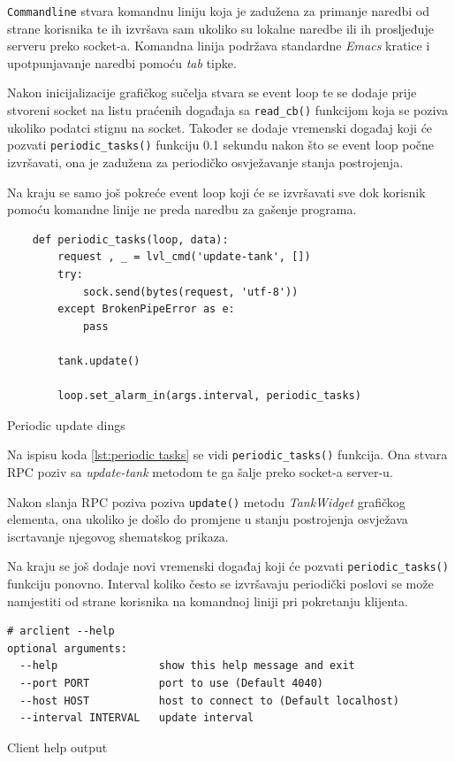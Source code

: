 \texttt{Commandline} stvara komandnu liniju koja je zadužena za
primanje naredbi od strane korisnika te ih izvršava sam ukoliko su lokalne
naredbe ili ih prosljeđuje serveru preko socket-a. Komandna linija podržava
standardne \emph{Emacs} kratice i upotpunjavanje naredbi pomoću \emph{tab}
tipke.

Nakon inicijalizacije grafičkog sučelja stvara se event loop te se dodaje prije
stvoreni socket na listu praćenih događaja sa \texttt{read_cb()}
funkcijom koja se poziva ukoliko podatci stignu na socket. Također se dodaje
vremenski događaj koji će pozvati \texttt{periodic_tasks()} funkciju
0.1 sekundu nakon što se event loop počne izvršavati, ona je zadužena za
periodičko osvježavanje stanja postrojenja.

Na kraju se samo još pokreće event loop koji će se izvršavati sve dok korisnik
pomoću komandne linije ne preda naredbu za gašenje programa.

\begin{listing}[H]
\centering
\begin{verbatim}
    def periodic_tasks(loop, data):
        request , _ = lvl_cmd('update-tank', [])
        try:
            sock.send(bytes(request, 'utf-8'))
        except BrokenPipeError as e:
            pass

        tank.update()

        loop.set_alarm_in(args.interval, periodic_tasks)
\end{verbatim}
\caption{Periodic update dings}
\label{lst:periodic tasks}
\end{listing}

Na ispisu koda \ref{lst:periodic tasks} se vidi
\texttt{periodic_tasks()} funkcija. Ona stvara RPC poziv sa
\emph{update-tank} metodom te ga šalje preko socket-a server-u.

Nakon slanja RPC poziva poziva \texttt{update()} metodu
\emph{TankWidget} grafičkog elementa, ona ukoliko je došlo do promjene u stanju
postrojenja osvježava iscrtavanje njegovog shematskog prikaza.

Na kraju se još dodaje novi vremenski događaj koji će pozvati
\texttt{periodic_tasks()} funkciju ponovno. Interval koliko često se
izvršavaju periodički poslovi se može namjestiti od strane korisnika na
komandnoj liniji pri pokretanju klijenta.

\begin{listing}[H]
\centering
\begin{verbatim}
# arclient --help
optional arguments:
  --help                show this help message and exit
  --port PORT           port to use (Default 4040)
  --host HOST           host to connect to (Default localhost)
  --interval INTERVAL   update interval
\end{verbatim}
\caption{Client help output}
\label{lst:client_help}
\end{listing}

